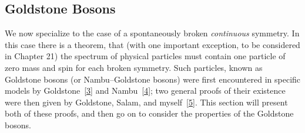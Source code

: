 \subsection{Goldstone Bosons}
\label{sec:19.2}

We now specialize to the case of a spontaneously broken \emph{continuous}
symmetry. In this case there is a theorem, that (with one important exception,
to be considered in Chapter 21) the spectrum of physical particles must
contain one particle of zero mass and spin for each broken symmetry. Such
particles, known as Goldstone bosons (or Nambu--Goldstone bosons) were first
encountered in specific models by Goldstone~\hyperref[ch19-ref-3]{[3]} and
Nambu~\hyperref[ch19-ref-4]{[4]}; two general proofs of their existence were
then given by Goldstone, Salam, and myself~\hyperref[ch19-ref-5]{[5]}. This
section will present both of these proofs, and then go on to consider the
properties of the Goldstone bosons.

